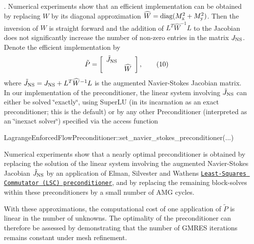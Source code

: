 \sigma {}. \] Numerical experiments show that an efficient implementation can be obtained by replacing $W$ by its diagonal approximation $\widehat{W} = \mbox{diag}(M_{\rm x}^{2}+M_{\rm y}^{2})$. Then the inversion of $W$ is straight forward and the addition of $L^{T}{\widehat{W}}^{-1}L$ to the Jacobian does not significantly increase the number of non-\/zero entries in the matrix $J_{\rm NS}$. Denote the efficient implementation by \[ \tilde{P} = \left[ \begin{array}{cc} { \tilde{J}_{\rm NS}}& \\ & \widehat{W} \end{array} \right], \ \ \ \ \ \ (10) \] where $\tilde{J}_{\rm NS} =J_{\rm NS}+ L^{T}{\widehat{W}}^{-1}L$ is the augmented Navier-\/\+Stokes Jacobian matrix. In our implementation of the preconditioner, the linear system involving $\tilde{J}_{\rm NS}$ can either be solved \char`\"{}exactly\char`\"{}, using {\ttfamily Super\+LU} (in its incarnation as an exact preconditioner; this is the default) or by any other {\ttfamily Preconditioner} (interpreted as an \char`\"{}inexact solver\char`\"{}) specified via the access function 
\begin{DoxyCode}
LagrangeEnforcedFlowPreconditioner::set\_navier\_stokes\_preconditioner(...)
\end{DoxyCode}
 Numerical experiments show that a nearly optimal preconditioner is obtained by replacing the solution of the linear system involving the augmented Navier-\/\+Stokes Jacobian $ \tilde{J}_{\rm NS} $ by an application of Elman, Silvester and Wathen\textquotesingle{}s \href{../../lsc_navier_stokes/html/index.html}{\tt Least-\/\+Squares Commutator (L\+SC) preconditioner}, and by replacing the remaining block-\/solves within these preconditioners by a small number of A\+MG cycles.

With these approximations, the computational cost of one application of $\tilde P$ is linear in the number of unknowns. The optimality of the preconditioner can therefore be assessed by demonstrating that the number of G\+M\+R\+ES iterations remains constant under mesh refinement.




